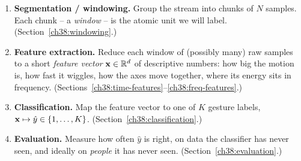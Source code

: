 \begin{enumerate}
  \item \textbf{Segmentation / windowing.} Group the stream into chunks of $N$
        samples. Each chunk -- a \emph{window} -- is the atomic unit we will
        label. (Section~\ref{ch38:windowing}.)
  \item \textbf{Feature extraction.} Reduce each window of (possibly many) raw
        samples to a short \emph{feature vector} $\mathbf{x} \in \mathbb{R}^{d}$ of
        descriptive numbers: how big the motion is, how fast it wiggles, how the
        axes move together, where its energy sits in frequency.
        (Sections~\ref{ch38:time-features}--\ref{ch38:freq-features}.)
  \item \textbf{Classification.} Map the feature vector to one of $K$ gesture
        labels, $\mathbf{x} \mapsto \hat{y} \in \{1,\dots,K\}$.
        (Section~\ref{ch38:classification}.)
  \item \textbf{Evaluation.} Measure how often $\hat{y}$ is right, on data the
        classifier has never seen, and ideally on \emph{people} it has never
        seen. (Section~\ref{ch38:evaluation}.)
\end{enumerate}

